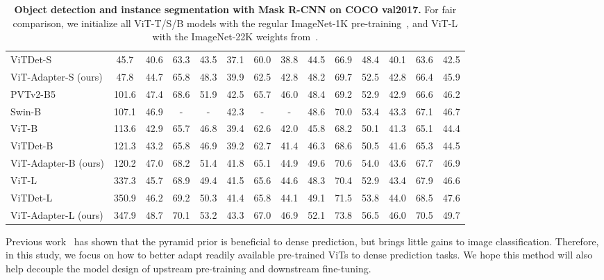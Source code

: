 \documentclass{article} \usepackage{iclr2023_conference,times}
\begin{document}
\begin{table}[t]
{\begin{tabular}{l|c|cccccc|cccccc}
        ViTDet-S~\citep{li2022exploring} & 45.7 & 40.6 & 63.3 & 43.5 & 37.1 & 60.0 & 38.8 & 44.5 & 66.9 & 48.4 & 40.1 & 63.6 & 42.5 \\
        \rowcolor{gray!20} 
        ViT-Adapter-S (ours)  & 47.8 
        & 44.7 & 65.8 & 48.3 & 39.9 & 62.5 & 42.8 & 48.2 & 69.7 & 52.5 & 42.8 & 66.4 & 45.9  \\
        \midrule
        PVTv2-B5~\citep{wang2021pvtv2} & 101.6 
        & 47.4 & 68.6 & 51.9 & 42.5 & 65.7 & 46.0 & 48.4 & 69.2 & 52.9 & 42.9 & 66.6 & 46.2  \\
        Swin-B~\citep{liu2021swin} & 107.1 
        & 46.9 & - & - & 42.3 & - & - & 48.6 & 70.0 & 53.4 & 43.3 & 67.1 & 46.7  \\
ViT-B~\citep{li2021benchmarking} & 113.6 
        & 42.9 & 65.7 & 46.8 & 39.4 & 62.6 & 42.0 & 45.8 & 68.2 & 50.1 & 41.3 & 65.1 & 44.4  \\
        ViTDet-B~\citep{li2022exploring} & 121.3 & 43.2 & 65.8 & 46.9 & 39.2 & 62.7 & 41.4
        & 46.3 & 68.6 & 50.5 & 41.6 & 65.3 & 44.5\\
        \rowcolor{gray!20} 
        ViT-Adapter-B (ours) & 120.2 
        & 47.0 & 68.2 & 51.4 & 41.8 & 65.1 & 44.9 & 49.6 & 70.6 & 54.0 & 43.6 & 67.7 & 46.9  \\
	    \midrule
ViT-L~\citep{li2021benchmarking} & 337.3 
        & 45.7 & 68.9 & 49.4 & 41.5 & 65.6 & 44.6 & 48.3 & 70.4 & 52.9 & 43.4 & 67.9 & 46.6  \\
        ViTDet-L~\citep{li2022exploring} & 350.9 & 46.2 & 69.2 & 50.3 & 41.4 & 65.8 & 44.1 & 49.1 & 71.5 & 53.8 & 44.0 & 68.5 & 47.6\\
        \rowcolor{gray!20} 
        ViT-Adapter-L (ours) & 347.9
        & 48.7 & 70.1 & 53.2 & 43.3 & 67.0 & 46.9 & 52.1 & 73.8 & 56.5 & 46.0 & 70.5 & 49.7  \\
        \bottomrule
    \end{tabular}}
    
    \caption{\textbf{Object detection and instance segmentation with Mask R-CNN on COCO val2017.} 
For fair comparison, we initialize all ViT-T/S/B models with the regular ImageNet-1K pre-training~\citep{touvron2021training}, and ViT-L with the ImageNet-22K weights from~\citep{steiner2021train}. 
}
    \label{tab:results_detection_mask}
\end{table} 
Previous work~\citep{wang2021pyramid} has shown that the pyramid prior is beneficial to dense prediction, but brings little gains to image classification.
Therefore, in this study, we focus on how to better adapt readily available pre-trained ViTs to dense prediction tasks.
We hope this method will also help decouple the model design of upstream pre-training and downstream fine-tuning.
\end{document}
